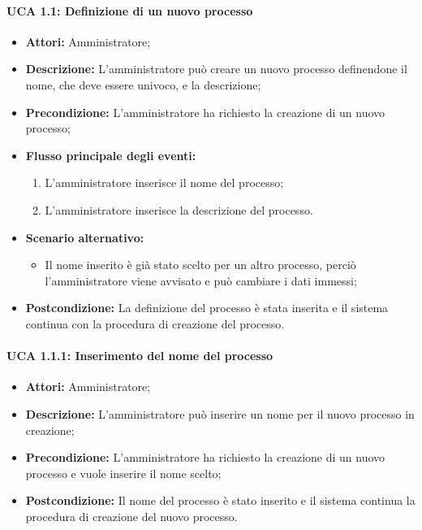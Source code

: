 \paragraph{UCA 1.1: Definizione di un nuovo processo}
\begin{itemize}
\item \textbf{Attori:}
 Amministratore;
\item \textbf{Descrizione:} 
L'amministratore può creare un nuovo processo definendone il nome, che deve essere univoco, e la descrizione;
\item \textbf{Precondizione:} L'amministratore ha richiesto la creazione di un nuovo processo;
\item \textbf{Flusso principale degli eventi:} 
\begin{enumerate}
\item L'amministratore inserisce il nome del processo;
\item L'amministratore inserisce la descrizione del processo.
\end{enumerate}
\item \textbf{Scenario alternativo:}
\begin{itemize}
\item Il nome inserito è già stato scelto per un altro processo, perciò l'amministratore viene avvisato e può cambiare i dati immessi;
\end{itemize}
\item \textbf{Postcondizione:} 
La definizione del processo è stata inserita e il sistema continua con la procedura di creazione del processo.
\end{itemize}

\paragraph{UCA 1.1.1: Inserimento del nome del processo}
\begin{itemize}
\item \textbf{Attori:}
 Amministratore;
\item \textbf{Descrizione:} 
L'amministratore può inserire un nome per il nuovo processo in creazione; 
\item \textbf{Precondizione:}
 L'amministratore ha richiesto la creazione di un nuovo processo e vuole inserire il nome scelto;
\item \textbf{Postcondizione:} 
Il nome del processo è stato inserito e il sistema continua la procedura di creazione del nuovo processo.
\end{itemize}


